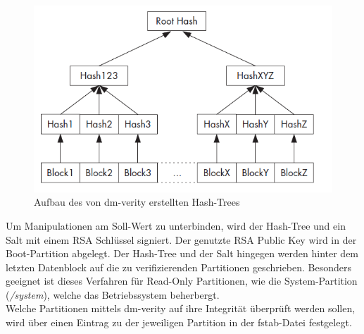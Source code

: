 	\begin{figure}[h]
		\centering
		\includegraphics[width=0.7\linewidth]{android_pages/graphics/dm_verity_hash_tree.png}
		\caption[Aufbau des Hash-Trees]{Aufbau des von dm-verity erstellten Hash-Trees\protect\cite[S. 255]{Drake2014}}
		\label{fig:dm-verity-table}
	\end{figure}
	
\begin{flushleft}
	Um Manipulationen am Soll-Wert zu unterbinden, wird der Hash-Tree und ein Salt mit einem RSA Schlüssel signiert. Der genutzte RSA Public Key wird in der Boot-Partition abgelegt\cite[S. 255]{Drake2014}. Der Hash-Tree und der Salt hingegen werden hinter dem letzten Datenblock auf die zu verifizierenden Partitionen geschrieben. Besonders geeignet ist dieses Verfahren für Read-Only Partitionen, wie die System-Partition (\textit{/system}), welche das Betriebssystem beherbergt.\\
	Welche Partitionen mittels dm-verity auf ihre Integrität überprüft werden sollen, wird über einen Eintrag zu der jeweiligen Partition in der fstab-Datei festgelegt.
\end{flushleft}

